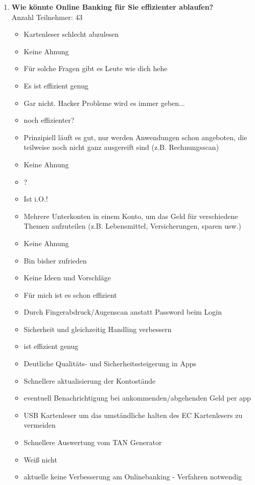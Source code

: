 \begin{enumerate}
     \item \textbf{Wie könnte Online Banking für Sie effizienter ablaufen?}\\ Anzahl Teilnehmer: 43
     \begin{itemize}
        \item Kartenleser schlecht abzulesen
        \item Keine Ahnung
        \item Für solche Fragen gibt es Leute wie dich hehe
        \item Es ist effizient genug
        \item Gar nicht. Hacker Probleme wird es immer geben...
        \item noch effizienter?
        \item Prinzipiell läuft es gut, nur werden Anwendungen schon angeboten, die teilweise noch nicht ganz ausgereift sind (z.B. Rechnungsscan)
        \item Keine Ahnung
        \item ?
        \item Ist i.O.!
        \item Mehrere Unterkonten in einem Konto, um das Geld für verschiedene Themen aufzuteilen (z.B. Lebensmittel, Versicherungen, sparen usw.)
        \item Keine Ahnung
        \item Bin bisher zufrieden
        \item Keine Ideen und Vorschläge
        \item Für mich ist es schon effizient
        \item Durch Fingerabdruck/Augenscan anstatt Password beim Login
        \item Sicherheit und gleichzeitig Handling verbessern
        \item ist effizient genug
        \item Deutliche Qualitäts- und Sicherheitssteigerung in Apps
        \item Schnellere aktualisierung der Kontostände
        \item eventuell Benachrichtigung bei ankommenden/abgehenden Geld per app
        \item USB Kartenleser um das umständliche halten des EC Kartenlesers zu vermeiden
        \item Schnellere Auswertung vom TAN Generator
        \item Weiß nicht
        \item aktuelle keine Verbesserung am Onlinebanking - Verfahren notwendig

\end{itemize}
\end{enumerate}
